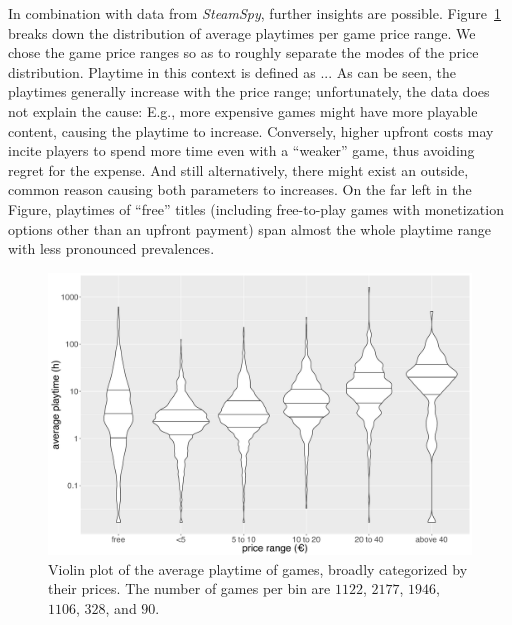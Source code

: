 

In combination with data from \textit{SteamSpy}, further insights are possible. Figure~\ref{fig:steam-cost-vs-playtime-violin} breaks down the distribution of average playtimes per game price range. We chose the game price ranges so as to roughly separate the modes of the price distribution. %
Playtime in this context is defined as ...
As can be seen, the playtimes generally increase with the price range; unfortunately, the data does not explain the cause: E.g., more expensive games might have more playable content, causing the playtime to increase. Conversely, higher upfront costs may incite players to spend more time even with a ``weaker'' game, thus avoiding regret for the expense. And still alternatively, there might exist an outside, common reason causing both parameters to increases. On the far left in the Figure, playtimes of ``free'' titles (including free-to-play games with monetization options other than an upfront payment) span almost the whole playtime range with less pronounced prevalences.


\begin{figure}[!t]
	\centering
	\includegraphics[width=1.0\columnwidth]{images/steam-cost-vs-playtime-non-sale.pdf}
	\caption{Violin plot of the average playtime of \steam games, broadly categorized by their prices. The number of games per bin are $1122$, $2177$, $1946$, $1106$, $328$, and $90$.}
\label{fig:steam-cost-vs-playtime-violin}
\end{figure}



